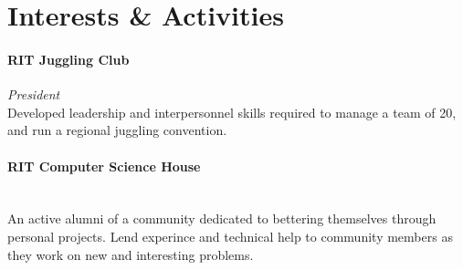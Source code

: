 \documentclass[10pt]{Article}
\begin{document}
\section*{\large Interests \& Activities}
\paragraph{\bf RIT Juggling Club}{\it President}~\\
Developed leadership and interpersonnel skills required to manage a team of 20, and run a regional juggling convention.
\paragraph{\bf RIT Computer Science House}~\\
An active alumni of a community dedicated to bettering themselves through personal projects. Lend experince and technical help to community members as they work on new and interesting problems.
\end{document}
